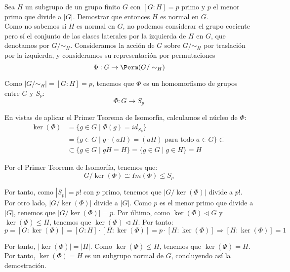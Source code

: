\begin{ejercicio}\label{ej:6.16}
    Sea $H$ un subgrupo de un grupo finito $G$ con $[G : H] = p$ primo y $p$ el menor primo que divide a $|G|$. Demostrar que entonces $H$ es normal en $G$.\\


    Como no sabemos si $H$ es normal en $G$, no podemos considerar el grupo cociente pero sí el conjunto de las clases laterales por la izquierda de $H$ en $G$, que denotamos por $G/\sim_H$. Consideramos la acción de $G$ sobre $G/\sim_H$ por traslación por la izquierda, y consideramos su representación por permutaciones
    \begin{equation*}
        \Phi: G \to \Perm(G/\sim_H)
    \end{equation*}

    Como $|G/\sim_H| = [G:H] = p$, tenemos que $\Phi$ es un homomorfismo de grupos entre $G$ y $S_p$:
    \begin{equation*}
        \Phi: G \to S_p
    \end{equation*}

    En vistas de aplicar el Primer Teorema de Isomorfía, calculamos el núcleo de $\Phi$:
    \begin{align*}
        \ker(\Phi) &= \{g\in G\mid \Phi(g) = id_{S_p}\}\\
        &= \{g\in G\mid g\cdot (aH) = (aH)\text{ para todo }a\in G\} \subset\\
        &\subset \{g\in G\mid gH = H\} = \{g\in G\mid g\in H\} = H
    \end{align*}

    Por el Primer Teorema de Isomorfía, tenemos que:
    \begin{equation*}
        G/\ker(\Phi) \cong Im(\Phi) \leq S_p
    \end{equation*}

    Por tanto, como $|S_p| = p!$ con $p$ primo, tenemos que $|G/\ker(\Phi)|$ divide a $p!$.
    Por otro lado, $|G/\ker(\Phi)|$ divide a $|G|$. Como $p$ es el menor primo que divide a $|G|$, tenemos que $|G/\ker(\Phi)|=p$.
    Por último, como $\ker(\Phi)\lhd G$ y $\ker(\Phi)\leq H$, tenemos que $\ker(\Phi)\lhd H$. Por tanto:
    \begin{equation*}
        p = [G:\ker(\Phi)] = [G:H]\cdot [H:\ker(\Phi)] = p\cdot [H:\ker(\Phi)]
        \Longrightarrow [H:\ker(\Phi)]=1
    \end{equation*}

    Por tanto, $|\ker(\Phi)|=|H|$. Como $\ker(\Phi)\leq H$, tenemos que $\ker(\Phi)=H$. Por tanto, $\ker(\Phi)=H$ es un subgrupo normal de $G$, concluyendo así la demostración.
\end{ejercicio}

